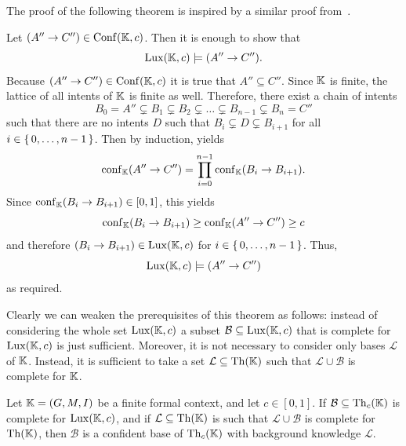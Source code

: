 The proof of the following theorem is inspired by a similar proof
from~\cite{DBLP:conf/ki/StummeTBPL01}.

\begin{Proof}
  Let $(A'' \to C'') \in \operatorname{Conf}({\mathbb{K}}, c)$.  Then it is enough to show that
  \begin{equation*}
    \operatorname{Lux}({\mathbb{K}}, c) \models (A'' \to C'').
  \end{equation*}
  Because $(A'' \to C'') \in \operatorname{Conf}({\mathbb{K}}, c)$ it is true that $A'' \subseteq C''$.  Since
  ${\mathbb{K}}$ is finite, the lattice of all intents of ${\mathbb{K}}$ is finite as well.
  Therefore, there exist a chain of intents
  \begin{equation*}
    B_0 = A'' \subsetneq B_1 \subsetneq B_2 \subsetneq \dots \subsetneq B_{n-1} \subsetneq B_n = C''
  \end{equation*}
  such that there are no intents $D$ such that $B_i \subsetneq D \subsetneq B_{i+1}$ for
  all $i \in {\ensuremath{\{\, 0, \dots, n-1 \,\}}}$.  Then by induction,
   yields
  \begin{equation*}
    \operatorname{conf}_{{\mathbb{K}}}(A'' \to C'') = \prod_{i = 0}^{n-1} \operatorname{conf}_{{\mathbb{K}}}(B_i \to B_{i+1}).
  \end{equation*}
  Since $\operatorname{conf}_{{\mathbb{K}}}(B_i \to B_{i+1}) \in [0,1]$, this yields
  \begin{equation*}
    \operatorname{conf}_{{\mathbb{K}}}(B_i \to B_{i+1}) \ge \operatorname{conf}_{{\mathbb{K}}}(A'' \to C'') \ge c
  \end{equation*}
  and therefore $(B_i \to B_{i+1}) \in \operatorname{Lux}({\mathbb{K}}, c)$ for $i \in {\ensuremath{\{\,0, \dots, n-1\,\}}}$.  Thus,
  \begin{equation*}
    \operatorname{Lux}({\mathbb{K}}, c) \models (A'' \to C'')
  \end{equation*}
  as required.
\end{Proof}

Clearly we can weaken the prerequisites of this theorem as follows: instead of considering
the whole set $\operatorname{Lux}({\mathbb{K}}, c)$ a subset $\mathcal{B} \subseteq \operatorname{Lux}({\mathbb{K}}, c)$ that is
complete for $\operatorname{Lux}({\mathbb{K}}, c)$ is just sufficient.  Moreover, it is not necessary to
consider only bases $\mathcal{L}$ of ${\mathbb{K}}$.  Instead, it is sufficient to take a set
$\mathcal{L} \subseteq \operatorname{Th}({\mathbb{K}})$ such that $\mathcal{L} \cup \mathcal{B}$ is complete
for ${\mathbb{K}}$.

\begin{Corollary}
  \label{cor:weakened-luxenburger-base}
  Let ${\mathbb{K}} = (G, M, I)$ be a finite formal context, and let $c \in [0,1]$.  If
  $\mathcal{B} \subseteq \operatorname{Th}_c({\mathbb{K}})$ is complete for $\operatorname{Lux}({\mathbb{K}}, c)$, and if
  $\mathcal{L} \subseteq \operatorname{Th}({\mathbb{K}})$ is such that $\mathcal{L} \cup \mathcal{B}$ is
  complete for $\operatorname{Th}({\mathbb{K}})$, then $\mathcal{B}$ is a confident base of $\operatorname{Th}_c({\mathbb{K}})$
  with background knowledge $\mathcal{L}$.
\end{Corollary}

